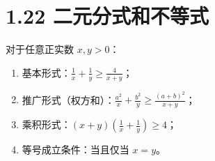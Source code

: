 \documentclass{article}
\begin{document}
\section*{1.22 二元分式和不等式}
对于任意正实数 \( x,y>0 \)：
\begin{enumerate}
    \item 基本形式：\( \frac{1}{x}+\frac{1}{y} \geq \frac{4}{x+y} \)；
    \item 推广形式（权方和）：\( \frac{a^2}{x}+\frac{b^2}{y} \geq \frac{(a+b)^2}{x+y} \)；
    \item 乘积形式：\( (x+y)\left(\frac{1}{x}+\frac{1}{y}\right) \geq 4 \)；
    \item 等号成立条件：当且仅当 \( x=y \)。
\end{enumerate}
\end{document}
